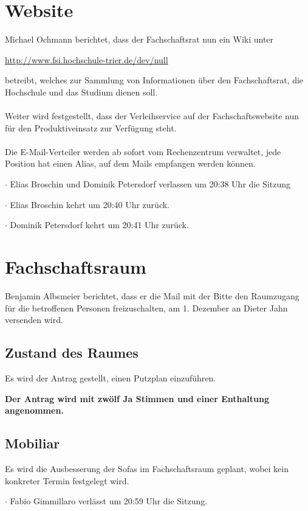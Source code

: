 \documentclass[a4paper, 11pt]{article} %
\begin{document}
\section{Website}
Michael Ochmann berichtet, dass der Fachschaftsrat nun ein Wiki unter \begin{center}
\url{http://www.fsi.hochschule-trier.de/dev/null}
\end{center} betreibt, welches zur Sammlung von Informationen über den Fachschaftsrat, die Hochschule und das Studium dienen soll.
\\\\
Weiter wird festgestellt, dass der Verleihservice auf der Fachschaftswebsite nun für den Produktiveinsatz zur Verfügung steht.
\\\\
Die E-Mail-Verteiler werden ab sofort vom Rechenzentrum verwaltet, jede Position hat einen Alias, auf dem Mails empfangen werden können.
\begin{flushleft}
\small
$\cdotp$ Elias Broschin und Dominik Petersdorf verlassen um 20:38 Uhr die Sitzung
\end{flushleft}
\begin{flushleft}
\small
$\cdotp$ Elias Broschin kehrt um 20:40 Uhr zurück.
\end{flushleft}
\begin{flushleft}
\small
$\cdotp$ Dominik Petersdorf kehrt um 20:41 Uhr zurück.
\end{flushleft}

\section{Fachschaftsraum}
Benjamin Albsmeier berichtet, dass er die Mail mit der Bitte den Raumzugang für die betroffenen Personen freizuschalten, am 1. Dezember an Dieter Jahn versenden wird.

\subsection{Zustand des Raumes}
Es wird der Antrag gestellt, einen Putzplan einzuführen.
\begin{center}
	\textbf{Der Antrag wird mit zwölf Ja Stimmen und einer Enthaltung angenommen.}
\end{center}

\subsection{Mobiliar}
Es wird die Ausbesserung der Sofas im Fachschaftsraum geplant, wobei kein konkreter Termin festgelegt wird. 
\begin{flushleft}
\small
	$\cdotp$ Fabio Gimmillaro verlässt um 20:59 Uhr die Sitzung.
\end{flushleft}
\end{document}
